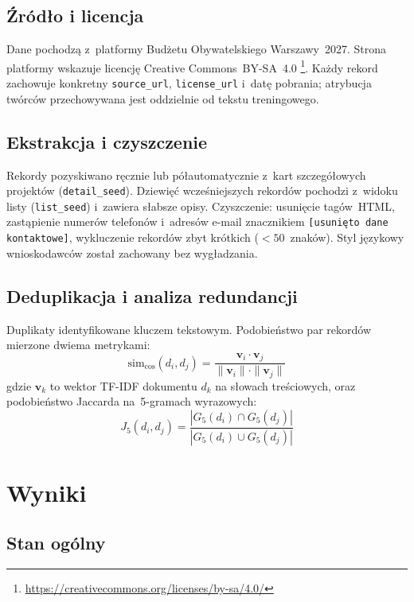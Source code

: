 \subsection*{Źródło i licencja}
Dane pochodzą z~platformy Budżetu Obywatelskiego Warszawy~2027.
Strona platformy wskazuje licencję Creative Commons~BY-SA~4.0%
\footnote{\url{https://creativecommons.org/licenses/by-sa/4.0/}}.
Każdy rekord zachowuje konkretny \texttt{source\_url},
\texttt{license\_url} i~datę pobrania; atrybucja twórców przechowywana
jest oddzielnie od tekstu treningowego.

\subsection*{Ekstrakcja i czyszczenie}
Rekordy pozyskiwano ręcznie lub półautomatycznie z~kart szczegółowych
projektów (\texttt{detail\_seed}). Dziewięć wcześniejszych rekordów
pochodzi z~widoku listy (\texttt{list\_seed}) i~zawiera słabsze opisy.
Czyszczenie: usunięcie tagów~HTML, zastąpienie numerów telefonów
i~adresów e-mail znacznikiem \texttt{[usunięto dane kontaktowe]},
wykluczenie rekordów zbyt krótkich ($< 50$~znaków). Styl językowy
wnioskodawców został zachowany bez wygładzania.

\subsection*{Deduplikacja i analiza redundancji}
Duplikaty identyfikowane kluczem tekstowym. Podobieństwo par rekordów
mierzone dwiema metrykami:
\[
  \mathrm{sim}_{\cos}(d_i, d_j)
    = \frac{\mathbf{v}_i \cdot \mathbf{v}_j}
           {\|\mathbf{v}_i\| \cdot \|\mathbf{v}_j\|}
\]
gdzie $\mathbf{v}_k$ to wektor TF-IDF dokumentu $d_k$ na słowach
treściowych, oraz podobieństwo Jaccarda na~5-gramach wyrazowych:
\[
  J_5(d_i, d_j)
    = \frac{|G_5(d_i) \cap G_5(d_j)|}
           {|G_5(d_i) \cup G_5(d_j)|}
\]

\section{Wyniki}

\subsection*{Stan ogólny}

